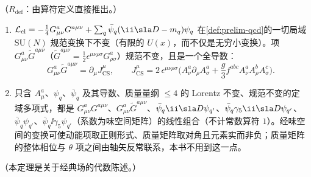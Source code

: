 \begin{theorem}\label{thm:qcd-gauge-invariance}
（$R_{\mathrm{def}}$：由算符定义直接推出。）
\begin{enumerate}[label=(\alph*),leftmargin=2.2em,itemsep=1pt,topsep=2pt]
\item $\mathcal L_{\mathrm{cl}}=-\frac14G^a_{\mu\nu}G^{a\mu\nu}+\sum_q\bar\psi_q(\ii\sla D-m_q)\psi_q$ 在\cref{def:prelim-qcd}的一切局域 $\mathrm{SU}(N)$ 规范变换下不变（有限的 $U(x)$，而不仅是无穷小变换）。项 $G^a_{\mu\nu}\tilde G^{a\mu\nu}$（$\tilde G^{a\mu\nu}=\frac12\epsilon^{\mu\nu\rho\sigma}G^a_{\rho\sigma}$）规范不变，且是一个全导数：
\begin{equation}\label{eq:qcd-chern-simons}
G^a_{\mu\nu}\tilde G^{a\mu\nu}=\partial_\mu J^\mu_{\mathrm{CS}},\qquad
J^\mu_{\mathrm{CS}}=2\,\epsilon^{\mu\nu\rho\sigma}\Big(A^a_\nu\partial_\rho A^a_\sigma+\frac g3f^{abc}A^a_\nu A^b_\rho A^c_\sigma\Big).
\end{equation}
\item 只含 $A^a_\mu$、$\psi_q$、$\bar\psi_q$ 及其导数、质量量纲 $\le4$ 的 Lorentz 不变、规范不变的定域多项式，都是 $G^a_{\mu\nu}G^{a\mu\nu}$、$G^a_{\mu\nu}\tilde G^{a\mu\nu}$、$\bar\psi_q\ii\sla D\psi_{q'}$、$\bar\psi_q\gamma_5\ii\sla D\psi_{q'}$、$\bar\psi_q\psi_{q'}$、$\bar\psi_q\ii\gamma_5\psi_{q'}$（系数为味空间矩阵）的线性组合（不计常数算符 $1$）。经味空间的变换可使动能项取正则形式、质量矩阵取对角且元素实而非负；质量矩阵的整体相位与 $\theta$ 项之间由轴矢反常联系，本书不用到这一点。
\end{enumerate}
（本定理是关于经典场的代数陈述。）
\end{theorem}

